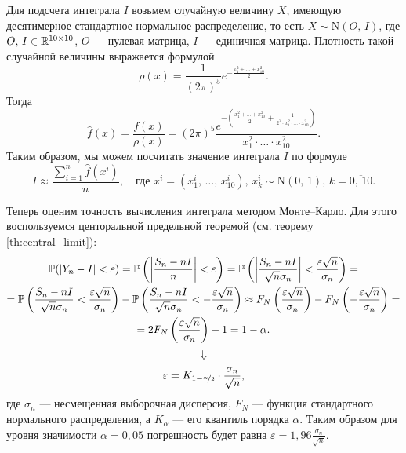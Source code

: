 Для подсчета интеграла $I$ возьмем случайную величину $X$, имеющую десятимерное стандартное нормальное распределение, то есть $X \sim \mbox{N} (O,\,I)$, где $O,\,I \in \mathbb{R}^{10 \times 10}$, $O$ --- нулевая матрица, $I$ --- единичная матрица. Плотность такой случайной величины выражается формулой
$$
        \rho(x)
        =
        \frac{1}{(2\pi)^5}
        e^{-\frac{x_1^2 + \ldots + x_{10}^2}{2}}.
$$
Тогда
$$
\boxed{
        \hat f(x) = \frac{f(x)}{\rho(x)}
        =
        (2\pi)^5
        \frac
        {
                e^{-\left(\frac{x_1^2 + \ldots + x_{10}^2}{2} + \frac{1}{2^7 \cdot x_1^2 \cdot \ldots \cdot x_{10}^2}\right)}
        }
        {x_1^2 \cdot \ldots \cdot x_{10}^2}.
}
$$
Таким образом, мы можем посчитать значение интеграла $I$ по формуле
$$
\boxed{
        I
        \approx
        \frac
        {\sum_{i=1}^{n} \hat f(x^i)}
        {n},
        \quad
        \mbox{где $x^i = (x_1^i,\,\ldots,\,x_{10}^i)$, $x_k^i\sim\mbox{N}(0,\,1)$, $k = \overline{0,\,10}$.}
}
$$

Теперь оценим точность вычисления интеграла методом Монте--Карло. Для этого воспользуемся центоральной предельной теоремой (см. теорему \ref{th:central_limit}):
\begin{multline*}
        \mathbb{P}(|Y_n - I| < \varepsilon)
        =
        \mathbb{P}\left( \left| \frac{S_n - nI}{n} \right| < \varepsilon \right)
        =
        \mathbb{P}\left( \left| \frac{S_n - nI}{\sqrt{n}\sigma_n} \right| < \frac{\varepsilon\sqrt{n}}{\sigma_n} \right)
        =\\=
        \mathbb{P}\left( \frac{S_n - nI}{\sqrt{n}\sigma_n}  < \frac{\varepsilon\sqrt{n}}{\sigma_n} \right)
        -
        \mathbb{P}\left( \frac{S_n - nI}{\sqrt{n}\sigma_n}  < -\frac{\varepsilon\sqrt{n}}{\sigma_n} \right)
        \approx
        F_N\left(\frac{\varepsilon\sqrt{n}}{\sigma_n}\right) - F_N\left(-\frac{\varepsilon\sqrt{n}}{\sigma_n}\right)
        =\\=
        2 F_N\left(\frac{\varepsilon\sqrt{n}}{\sigma_n}\right) - 1
        =
        1 - \alpha.
\end{multline*}
$$
        \Downarrow
$$
$$
        \varepsilon = K_{1 - \nicefrac{\alpha}{2}}\cdot \frac{\sigma_n}{\sqrt{n}},
$$
где $\sigma_n$ --- несмещенная выборочная дисперсия, $F_N$ --- функция стандартного нормального распределения, а $K_\alpha$ --- его квантиль порядка $\alpha$. Таким образом для уровня значимости $\alpha = 0,05$ погрешность будет равна $\varepsilon = 1,96\frac{\sigma_n}{\sqrt{n}}$.


